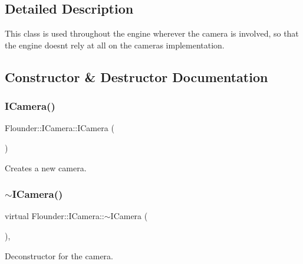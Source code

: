 \subsection{Detailed Description}
This class is used throughout the engine wherever the camera is involved, so that the engine doesn\textquotesingle{}t rely at all on the camera\textquotesingle{}s implementation. 



\subsection{Constructor \& Destructor Documentation}
\mbox{\label{class_flounder_1_1_i_camera_a7ff574ca957560727283922bb4af1156}} 
\subsubsection{\texorpdfstring{I\+Camera()}{ICamera()}}
{\footnotesize\ttfamily Flounder\+::\+I\+Camera\+::\+I\+Camera (\begin{DoxyParamCaption}{ }\end{DoxyParamCaption})\hspace{0.3cm}{\ttfamily [inline]}}



Creates a new camera. 

\mbox{\label{class_flounder_1_1_i_camera_a812ffcf7d09cb3ea85e8128bcc95e01a}} 
\subsubsection{\texorpdfstring{$\sim$\+I\+Camera()}{~ICamera()}}
{\footnotesize\ttfamily virtual Flounder\+::\+I\+Camera\+::$\sim$\+I\+Camera (\begin{DoxyParamCaption}{ }\end{DoxyParamCaption})\hspace{0.3cm}{\ttfamily [inline]}, {\ttfamily [virtual]}}



Deconstructor for the camera. 



